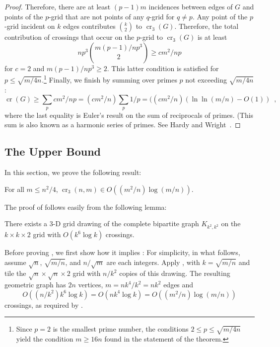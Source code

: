 \documentclass{patmorin}
\DeclareMathOperator{\crs}{cr}
\begin{document}
\begin{proof}
  Therefore, there are at least $(p-1)m$ incidences between edges of $G$
  and points of the $p$-grid that are not points of any $q$-grid for
  $q\neq p$.  Any point of the $p$-grid incident on $k$ edges contributes
  $\binom{k}{2}$ to $\crs_3(G)$.  Therefore, the total contribution of
  crossings that occur on the $p$-grid to $\crs_3(G)$ is at least
  \[
      np^3\binom{m(p-1)/np^3}{2} \ge cm^2/np
  \]
  for $c=2$ and $m(p-1)/np^3 \ge 2$.  This latter condition is satisfied
  for $p \le \sqrt{m/4n}$.\footnote{Since $p=2$ is the smallest prime
  number, the conditions $2\le p\le\sqrt{m/4n}$ yield the
  condition $m\ge 16n$ found in the statement of the theorem.} Finally,
  we finish by summing over primes $p$ not exceeding $\sqrt{m/4n}$:
  \[
     \crs(G) \ge \sum_{p} cm^2/np 
             = (cm^2/n) \sum_p 1/p 
             = ((cm^2/n)(\ln\ln(m/n)-O(1)) \enspace ,
  \]
  where the last equality is Euler's result on the sum of reciprocals
  of primes. (This sum is also known as a harmonic series of primes.
  See Hardy and Wright~\cite[Section~22.7]{hardy.wright:introduction}.
\end{proof}

\subsection{The Upper Bound}

In this section, we prove the following result:

\begin{thm}
  For all $m\le n^2/4$, $\crs_3(n,m) \in O((m^2/n)\log (m/n))$.
\end{thm}

The proof of  follows easily from the following
lemma:
\begin{lem}
  There exists a 3-D grid drawing of the complete bipartite graph
  $K_{k^2,k^2}$ on the $k\times k\times 2$ grid with $O(k^6\log k)$
  crossings.
\end{lem}

Before proving , we first show how it implies
: For simplicity, in what follows, assume
$\sqrt{n}$, $\sqrt{m/n}$, and $n/\sqrt{m}$ are each integers.
Apply , with $k=\sqrt{m/n}$ and tile the
$\sqrt{n}\times\sqrt{n}\times 2$ grid with $n/k^2$ copies of
this drawing. The resulting geometric graph has $2n$ vertices,
$m=nk^4/k^2=nk^2$ edges and
\[ 
   O((n/k^2)k^6\log k) = O(nk^4\log k) = O((m^2/n)\log(m/n))
\] 
crossings, as required by .
\end{document}
